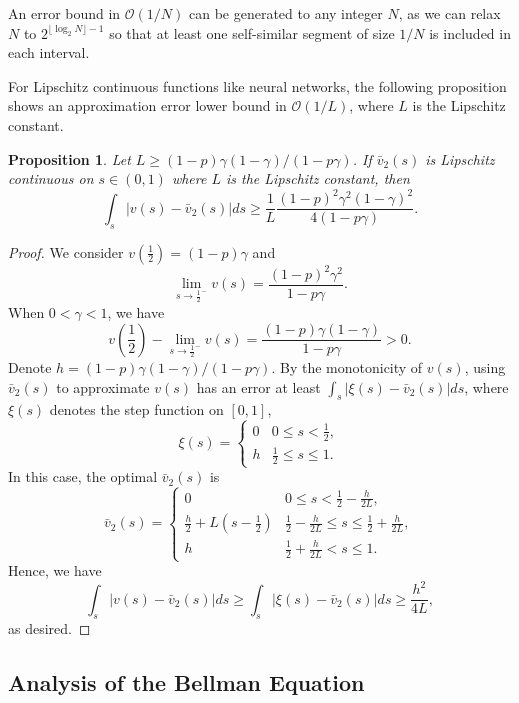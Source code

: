 \documentclass{article}
\newtheorem{proposition}[theorem]{Proposition}
\theoremstyle{named}
\newcommand{\OO}{\mathcal{O}}
\begin{document}
An error bound in $\OO(1/N)$ can be generated to any integer $N$, as we can relax $N$ to $2^{\lfloor\log_2N\rfloor-1}$ so that at least one self-similar segment of size $1/N$ is included in each interval.

For Lipschitz continuous functions like neural networks, the following proposition shows an approximation error lower bound in $\OO(1/L)$, where $L$ is the Lipschitz constant.

\begin{proposition}
\label{thm:approxlip}
Let $L\ge (1-p)\gamma(1-\gamma)/(1-p\gamma)$. If $\bar v_2(s)$ is Lipschitz continuous on $s\in (0,1)$ where $L$ is the Lipschitz constant, then
\[
\int_s \left| v(s)-\bar v_2(s) \right| ds \geq \frac{1}{L}\frac{(1-p)^2\gamma^2(1-\gamma)^2}{4(1-p\gamma)}.
\]
\end{proposition}

\begin{proof}
We consider $v(\frac{1}{2})=(1-p)\gamma$ and 
\[
\lim_{s\rightarrow {\frac{1}{2}}^-} v(s) = \frac{(1-p)^2\gamma^2}{1-p\gamma}.
\]
When $0<\gamma<1$, we have 
\[
v(\frac{1}{2}) - \lim_{s\rightarrow {\frac{1}{2}}^-} v(s) = \frac{(1-p)\gamma(1-\gamma)}{1-p\gamma} > 0.
\]
Denote $h = (1-p)\gamma(1-\gamma)/(1-p\gamma)$.
By the monotonicity of $v(s)$, using ${\bar v}_2(s)$ to approximate $v(s)$ has an error at least $\int_s \left| \xi(s)-\bar v_2(s) \right| ds$, where $\xi(s)$ denotes the step function on $[0,1]$,
\begin{equation*}
\xi(s) =
\begin{cases}
0 & 0\le s< \frac{1}{2},\\
h & \frac{1}{2} \le s \le 1.
\end{cases}       
\end{equation*}
In this case, the optimal ${\bar v}_2(s)$ is
\begin{equation*}
{\bar v}_2(s) =
\begin{cases}
0 & 0\le s< \frac{1}{2}-\frac{h}{2L},\\
\frac{h}{2} + L(s-\frac{1}{2}) & \frac{1}{2}-\frac{h}{2L}\le s\le \frac{1}{2}+\frac{h}{2L},\\
h & \frac{1}{2}+\frac{h}{2L} < s \le 1.
\end{cases}       
\end{equation*}
Hence, we have
\[
\int_s \left| v(s)-\bar v_2(s) \right| ds \ge \int_s \left| \xi(s)-\bar v_2(s) \right| ds \ge \frac{h^2}{4L},
\]
as desired.
\end{proof}

\subsection{Analysis of the Bellman Equation}
\label{sec:solvingbellman}
\end{document}
